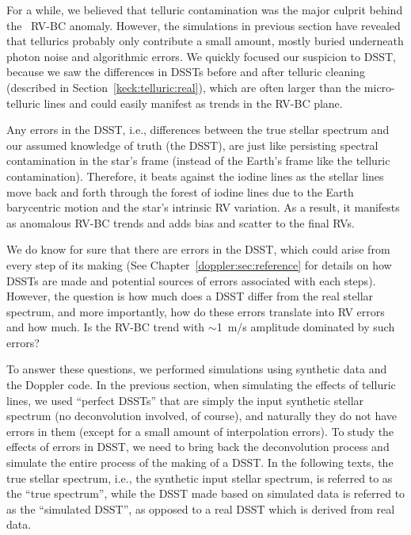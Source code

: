 
For a while, we believed that telluric contamination was the major culprit
behind the \keck\ RV-BC anomaly. However, the simulations in previous
section have revealed that tellurics probably only contribute a small
amount, mostly buried underneath photon noise and algorithmic
errors. We quickly focused our suspicion to DSST, because we saw the
differences in DSSTs before and after telluric cleaning (described in
Section~\ref{keck:telluric:real}), which are often larger than the
micro-telluric lines and could easily manifest as trends in the RV-BC
plane.

Any errors in the DSST, i.e., differences between the true stellar
spectrum and our assumed knowledge of truth (the DSST), are just like
persisting spectral contamination in the star's frame (instead of the
Earth's frame like the telluric contamination). Therefore, it beats
against the iodine lines as the stellar lines move back and forth
through the forest of iodine lines due to the Earth barycentric motion
and the star's intrinsic RV variation. As a result, it manifests as
anomalous RV-BC trends and adds bias and scatter to the final RVs.

We do know for sure that there are errors in the DSST, which could
arise from every step of its making (See
Chapter~\ref{doppler:sec:reference} for details on how DSSTs are made
and potential sources of errors associated with each steps). However,
the question is how much does a DSST differ from the real stellar
spectrum, and more importantly, how do these errors translate into RV
errors and how much. Is the RV-BC trend with $\sim$1~m/s amplitude
dominated by such errors?

To answer these questions, we performed simulations using synthetic
data and the Doppler code. In the previous section, when simulating
the effects of telluric lines, we used ``perfect DSSTs'' that are
simply the input synthetic stellar spectrum (no deconvolution
involved, of course), and naturally they do not have errors in them
(except for a small amount of interpolation errors). To study the
effects of errors in DSST, we need to bring back the deconvolution
process and simulate the entire process of the making of a DSST. In
the following texts, the true stellar spectrum, i.e., the synthetic
input stellar spectrum, is referred to as the ``true spectrum'', while
the DSST made based on simulated data is referred to as the
``simulated DSST'', as opposed to a real DSST which is derived from
real data.

